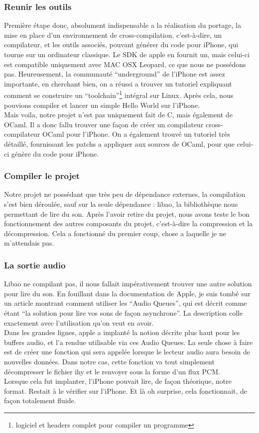 \documentclass[a4paper,12pt]{article}
\begin{document}
		\subsubsection{Reunir les outils}
Première étape donc, absolument indispensable a la réalisation du
portage, la mise en place d'un environnement de cross-compilation,
c'est-à-dire, un compilateur, et les outils associés,  pouvant générer du code
pour iPhone, qui
tourne sur un ordinateur classique. Le SDK de apple en fournit un, mais
celui-ci est compatible uniquement avec MAC OSX Leopard, ce que nous ne
possédons pas. Heureusement, la communauté ``underground'' de l'iPhone
est assez importante, en cherchant bien, on a réussi a trouver un
tutoriel expliquant comment se construire un
``toolchain''\footnote{logiciel et headers complet pour compiler un
programme} intégral sur Linux. Après cela, nous pouvions compiler et lancer un
simple Hello World sur l'iPhone.\\
Mais voila, notre projet n'est pas uniquement fait de C, mais également
de OCaml. Il a donc fallu trouver une façon de créer un compilateur
cross-compilateur OCaml
pour l'iPhone. On a également trouvé un tutoriel très détaillé, fournissant les
patchs a appliquer aux sources de OCaml, pour que celui-ci génère du code pour
iPhone.
		\subsubsection{Compiler le projet}
Notre projet ne possédant que très peu de dépendance externes, la
compilation s'est bien déroulée, sauf sur la seule dépendance : libao, la
bibliothèque nous permettant de lire du son. Après l'avoir retire du
projet, nous avons teste le bon fonctionnement des autres composants du
projet, c'est-à-dire la compression et la décompression. Cela a
fonctionné du premier coup, chose a laquelle je ne m'attendais pas.\\
		\subsubsection{La sortie audio}
Libao ne compilant pas, il nous fallait impérativement trouver une autre
solution pour lire du son. En fouillant dans la documentation de Apple, je suis
tombé sur un article montrant comment utiliser les ``Audio Queues'', qui est
décrit comme étant ``la solution pour lire vos sons de façon asynchrone''. La
description colle exactement avec l'utilisation qu'on veut en avoir.\\
Dans les grandes lignes, apple a implanté la notion décrite plus haut pour
les buffers audio, et l'a rendue utilisable via ces Audio Queues. La seule chose
à faire est de créer une fonction qui sera appelée lorsque le lecteur audio aura
besoin de nouvelles données. Dans notre cas, cette fonction va tout simplement
décompresser le fichier ihy et le renvoyer sous la forme d'un flux PCM.\\
Lorsque cela fut implanter, l'iPhone pouvait lire, de façon théorique, notre
format. Restait à le vérifier sur l'iPhone. Et là oh surprise, cela
fonctionnait, de façon totalement fluide. 
\end{document}
